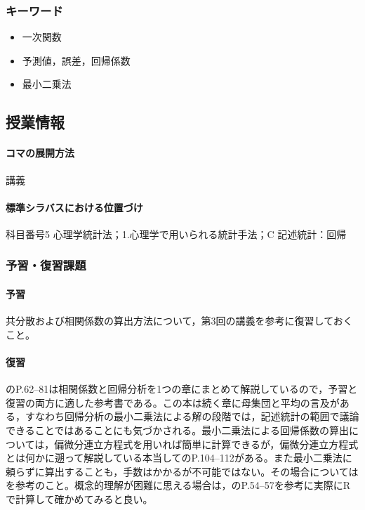 \subsubsection{キーワード}
\begin{itemize}
	\item 一次関数
	\item 予測値，誤差，回帰係数
	\item 最小二乗法
\end{itemize}
\subsection{授業情報}
\paragraph{コマの展開方法}
講義
\paragraph{標準シラバスにおける位置づけ}
科目番号5 心理学統計法；1.心理学で用いられる統計手法；C 記述統計：回帰
\subsubsection{予習・復習課題}
\paragraph{予習}
共分散および相関係数の算出方法について，第3回の講義を参考に復習しておくこと。
\paragraph{復習}
\citet{Yamauchi201001}のP.62--81は相関係数と回帰分析を1つの章にまとめて解説しているので，予習と復習の両方に適した参考書である。この本は続く章に母集団と平均の言及がある，すなわち回帰分析の最小二乗法による解の段階では，記述統計の範囲で議論できることではあることにも気づかされる。最小二乗法による回帰係数の算出については，偏微分連立方程式を用いれば簡単に計算できるが，偏微分連立方程式とは何かに遡って解説している本当して\citet{kosugi2018}のP.104--112がある。また最小二乗法に頼らずに算出することも，手数はかかるが不可能ではない。その場合については\citet{Nishiuchi201712}を参考のこと。概念的理解が困難に思える場合は，\citet{kosugi2018}のP.54--57を参考に実際にRで計算して確かめてみると良い。
